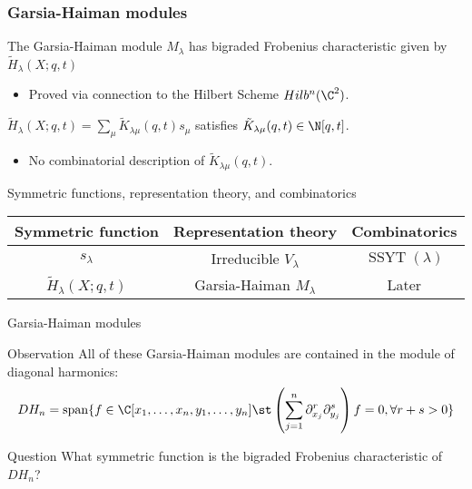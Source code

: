 \documentclass[dvipsnames]{beamer}
\newcommand{\Htild}{\tilde{H}}
\renewcommand{\Span}{\operatorname{span}}
\DeclareMathOperator{\SSYT}{SSYT}
\theoremstyle{definition}
\newcounter{c}
\begin{document}
\begin{frame}
  \frametitle{Garsia-Haiman modules}
  \begin{theorem}[Haiman, 2001]
    The Garsia-Haiman module \(M_\lambda\) has bigraded Frobenius
    characteristic given by \(\tilde{H}_\lambda(X;q,t)\)
  \end{theorem}\pause
  \begin{itemize}
  \item Proved via connection to the Hilbert Scheme \(Hilb^n(\C^2)\).\pause
  \end{itemize}
  \begin{corollary}
    \(\tilde{H}_\lambda(X;q,t) = \sum_\mu \tilde{K}_{\lambda \mu}(q,t) s_\mu\)
    satisfies \(\tilde{K}_{\lambda \mu}(q,t) \in \N[q,t]\).
  \end{corollary}\pause
  \begin{itemize}
  \item No combinatorial description of \(\tilde{K}_{\lambda \mu}(q,t)\).
  \end{itemize}
  \end{frame}
  \begin{frame}{Symmetric functions, representation theory, and combinatorics}
    \begin{tabular}{ccc}
      Symmetric function & Representation theory & Combinatorics 
      \\
      \hline
      \(s_\lambda\) & Irreducible \(V_\lambda\) & \(\SSYT(\lambda)\) \\
      \(\Htild_\lambda(X;q,t)\) & Garsia-Haiman \(M_\lambda\) & Later
    \end{tabular}
  \end{frame}
  \begin{frame}{Garsia-Haiman modules}
  \begin{block}{Observation}
    All of these Garsia-Haiman modules are contained in the module of
    diagonal harmonics:  \[
      DH_n = \Span\{ f \in \C[x_1,\ldots,x_n,y_1,\ldots,y_n] \st
      \left(\sum_{j=1}^n \partial_{x_j}^r \partial_{y_j}^s\right) f = 0, \forall r+s>0\}
    \]
  \end{block}\pause
  \begin{block}{Question}
    What symmetric function is the bigraded Frobenius characteristic
    of \(DH_n\)?
  \end{block}
\end{frame}
\end{document}
